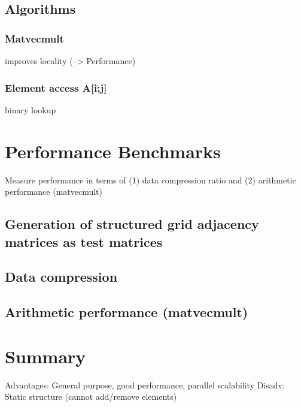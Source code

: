 \documentclass{article}
\begin{document}
  \subsection{Algorithms}

    \subsubsection{Matvecmult}
      improves locality (--> Performance)

    \subsubsection{Element access A[i;j]}
      binary lookup

\section{Performance Benchmarks}
  Measure performance in terms of (1) data compression ratio and (2) arithmetic performance (matvecmult)

  \subsection{Generation of structured grid adjacency matrices as test matrices}

  \subsection{Data compression}

  \subsection{Arithmetic performance (matvecmult)}

\section{Summary}
  Advantages: General purpose, good performance, parallel scalability
  Disadv: Static structure (cannot add/remove elements)
\end{document}
